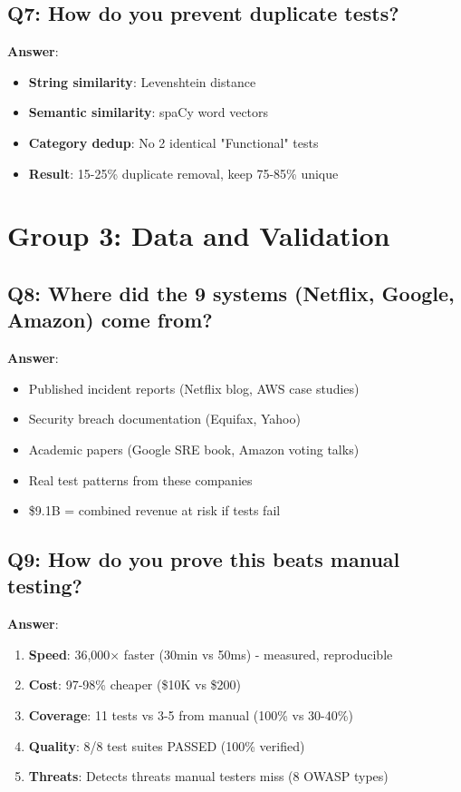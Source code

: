 \documentclass[12pt,a4paper]{report}
\begin{document}
\subsection{Q7: How do you prevent duplicate tests?}

\textbf{Answer}:
\begin{itemize}
    \item \textbf{String similarity}: Levenshtein distance
    \item \textbf{Semantic similarity}: spaCy word vectors
    \item \textbf{Category dedup}: No 2 identical "Functional" tests
    \item \textbf{Result}: 15-25\% duplicate removal, keep 75-85\% unique
\end{itemize}

\section{Group 3: Data and Validation}

\subsection{Q8: Where did the 9 systems (Netflix, Google, Amazon) come from?}

\textbf{Answer}:
\begin{itemize}
    \item Published incident reports (Netflix blog, AWS case studies)
    \item Security breach documentation (Equifax, Yahoo)
    \item Academic papers (Google SRE book, Amazon voting talks)
    \item Real test patterns from these companies
    \item \$9.1B = combined revenue at risk if tests fail
\end{itemize}

\subsection{Q9: How do you prove this beats manual testing?}

\textbf{Answer}:
\begin{enumerate}
    \item \textbf{Speed}: 36,000× faster (30min vs 50ms) - measured, reproducible
    \item \textbf{Cost}: 97-98\% cheaper (\$10K vs \$200)
    \item \textbf{Coverage}: 11 tests vs 3-5 from manual (100\% vs 30-40\%)
    \item \textbf{Quality}: 8/8 test suites PASSED (100\% verified)
    \item \textbf{Threats}: Detects threats manual testers miss (8 OWASP types)
\end{enumerate}
\end{document}
